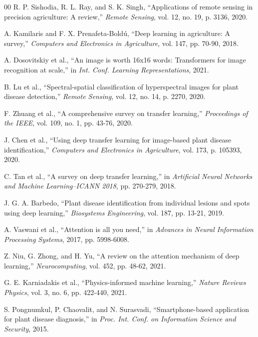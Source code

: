 \documentclass[conference]{IEEEtran}
\begin{document}
\begin{thebibliography}{00}
R. P. Sishodia, R. L. Ray, and S. K. Singh, ``Applications of remote sensing in precision agriculture: A review,'' \textit{Remote Sensing}, vol. 12, no. 19, p. 3136, 2020.

A. Kamilaris and F. X. Prenafeta-Boldú, ``Deep learning in agriculture: A survey,'' \textit{Computers and Electronics in Agriculture}, vol. 147, pp. 70-90, 2018.

A. Dosovitskiy et al., ``An image is worth 16x16 words: Transformers for image recognition at scale,'' in \textit{Int. Conf. Learning Representations}, 2021.

B. Lu et al., ``Spectral-spatial classification of hyperspectral images for plant disease detection,'' \textit{Remote Sensing}, vol. 12, no. 14, p. 2270, 2020.

F. Zhuang et al., ``A comprehensive survey on transfer learning,'' \textit{Proceedings of the IEEE}, vol. 109, no. 1, pp. 43-76, 2020.

J. Chen et al., ``Using deep transfer learning for image-based plant disease identification,'' \textit{Computers and Electronics in Agriculture}, vol. 173, p. 105393, 2020.

C. Tan et al., ``A survey on deep transfer learning,'' in \textit{Artificial Neural Networks and Machine Learning--ICANN 2018}, pp. 270-279, 2018.

J. G. A. Barbedo, ``Plant disease identification from individual lesions and spots using deep learning,'' \textit{Biosystems Engineering}, vol. 187, pp. 13-21, 2019.

A. Vaswani et al., ``Attention is all you need,'' in \textit{Advances in Neural Information Processing Systems}, 2017, pp. 5998-6008.

Z. Niu, G. Zhong, and H. Yu, ``A review on the attention mechanism of deep learning,'' \textit{Neurocomputing}, vol. 452, pp. 48-62, 2021.

G. E. Karniadakis et al., ``Physics-informed machine learning,'' \textit{Nature Reviews Physics}, vol. 3, no. 6, pp. 422-440, 2021.

S. Pongnumkul, P. Chaovalit, and N. Surasvadi, ``Smartphone-based application for plant disease diagnosis,'' in \textit{Proc. Int. Conf. on Information Science and Security}, 2015.


\end{thebibliography}
\end{document}
